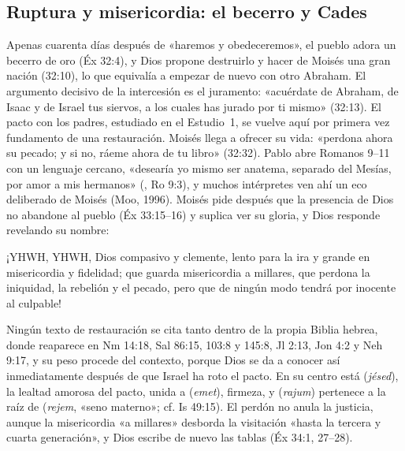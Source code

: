 \subsection{Ruptura y misericordia: el becerro y Cades}
Apenas cuarenta días después de «haremos y obedeceremos», el pueblo adora un becerro de oro (Éx 32:4), y Dios propone destruirlo y hacer de Moisés una gran nación (32:10), lo que equivalía a empezar de nuevo con otro Abraham. El argumento decisivo de la intercesión es el juramento: «acuérdate de Abraham, de Isaac y de Israel tus siervos, a los cuales has jurado por ti mismo» (32:13). El pacto con los padres, estudiado en el Estudio~1, se vuelve aquí por primera vez fundamento de una restauración. Moisés llega a ofrecer su vida: «perdona ahora su pecado; y si no, ráeme ahora de tu libro» (32:32). Pablo abre Romanos 9–11 con un lenguaje cercano, «desearía yo mismo ser anatema, separado del Mesías, por amor a mis hermanos» (, Ro 9:3), y muchos intérpretes ven ahí un eco deliberado de Moisés (Moo, 1996). Moisés pide después que la presencia de Dios no abandone al pueblo (Éx 33:15–16) y suplica ver su gloria, y Dios responde revelando su nombre:

\begin{cita}¡YHWH, YHWH, Dios compasivo y clemente, lento para la ira y grande en misericordia y fidelidad; que guarda misericordia a millares, que perdona la iniquidad, la rebelión y el pecado, pero que de ningún modo tendrá por inocente al culpable!\end{cita}

Ningún texto de restauración se cita tanto dentro de la propia Biblia hebrea, donde reaparece en Nm 14:18, Sal 86:15, 103:8 y 145:8, Jl 2:13, Jon 4:2 y Neh 9:17, y su peso procede del contexto, porque Dios se da a conocer así inmediatamente después de que Israel ha roto el pacto. En su centro está  (\emph{jésed}), la lealtad amorosa del pacto, unida a  (\emph{emet}), firmeza, y  (\emph{rajum}) pertenece a la raíz de  (\emph{rejem}, «seno materno»; cf. Is 49:15). El perdón no anula la justicia, aunque la misericordia «a millares» desborda la visitación «hasta la tercera y cuarta generación», y Dios escribe de nuevo las tablas (Éx 34:1, 27–28).

